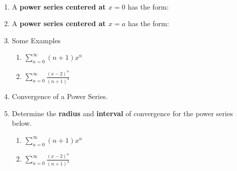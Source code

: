 \documentclass[11pt]{amsart}
\newcommand{\ds}{\displaystyle}
\begin{document}
\begin{center}
  \large
  \\
   
\end{center}

\begin{enumerate}
\item A \textbf{power series centered at $x=0$} has the form:\\

\vfill


\item A \textbf{power series centered at $x=a$} has the form:\\

\vfill

\item Some Examples
	\begin{enumerate}
	\item $\ds \sum_{n=0}^\infty (n+1)x^n$
	\vfill
	\item $\ds \sum_{n=0}^\infty \frac{(x-2)^n}{(n+1)^4}$
	\vfill
	\end{enumerate}
\newpage
\item Convergence of a Power Series.

\vfill

\item Determine the \textbf{radius} and \textbf{interval} of convergence for the power series below.
	\begin{enumerate}
	\item $\ds \sum_{n=0}^\infty (n+1)x^n$
	\vfill
	\item $\ds \sum_{n=0}^\infty \frac{(x-2)^n}{(n+1)^4}$
	\vfill
	\end{enumerate}

\end{enumerate}
\end{document}
